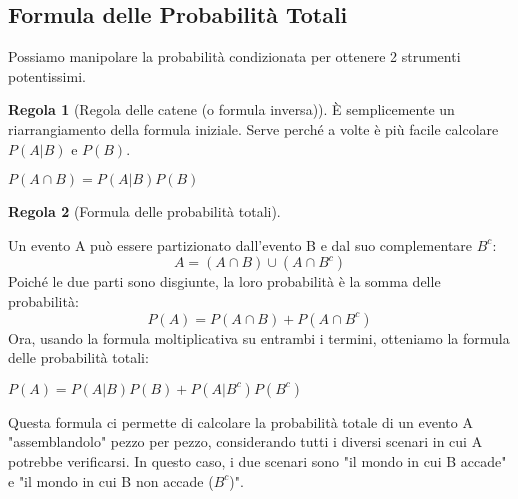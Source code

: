 \documentclass[a4paper, 11pt]{article}
\theoremstyle{definition}
\newtheorem{regola}{Regola}[section]
\begin{document}
\subsection{Formula delle Probabilità Totali}
Possiamo manipolare la probabilità condizionata per ottenere 2 strumenti potentissimi.

\begin{regola}[Regola delle catene (o formula inversa)]
    È semplicemente un riarrangiamento della formula iniziale. Serve perché a volte è più facile calcolare $P(A|B)$ e $P(B)$.
    \begin{formulabox}
        $P(A \cap B) = P(A|B)P(B)$
    \end{formulabox}
\end{regola}

\begin{regola}[Formula delle probabilità totali]
\begin{center}
\end{center}
Un evento A può essere partizionato dall'evento B e dal suo complementare $B^c$:
\[ A = (A \cap B) \cup (A \cap B^c) \]
Poiché le due parti sono disgiunte, la loro probabilità è la somma delle probabilità:
\[ P(A) = P(A \cap B) + P(A \cap B^c) \]
Ora, usando la formula moltiplicativa su entrambi i termini, otteniamo la formula delle probabilità totali:
\begin{formulabox}
    $P(A) = P(A|B)P(B) + P(A|B^c)P(B^c)$
\end{formulabox}
Questa formula ci permette di calcolare la probabilità totale di un evento A "assemblandolo" pezzo per pezzo, considerando tutti i diversi scenari in cui A potrebbe verificarsi. In questo caso, i due scenari sono "il mondo in cui B accade" e "il mondo in cui B non accade ($B^c$)".
\end{regola}
\end{document}

